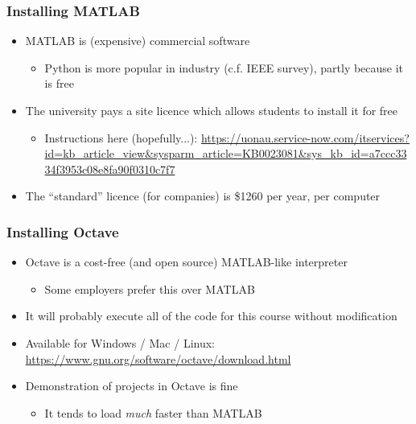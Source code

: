 \documentclass[14pt]{beamer}
\begin{document}
\begin{frame}
\frametitle{Installing MATLAB}
\begin{itemize}
\item MATLAB is (expensive) commercial software
	\begin{itemize}
		\item Python is more popular in industry (c.f. IEEE survey), partly because it is free
	\end{itemize}
\item The university pays a site licence which allows students to install it for free
	\begin{itemize}
		\item Instructions here (hopefully...): \url{https://uonau.service-now.com/itservices?id=kb_article_view&sysparm_article=KB0023081&sys_kb_id=a7ccc3334f3953c08e8fa90f0310c7f7}
	\end{itemize}
\item The ``standard'' licence (for companies) is \$1260 per year, per computer
\end{itemize}
\end{frame}

\begin{frame}
\frametitle{Installing Octave}
\begin{itemize}
\item Octave is a cost-free (and open source) MATLAB-like interpreter
	\begin{itemize}
		\item Some employers prefer this over MATLAB
	\end{itemize}
\item It will probably execute all of the code for this course without modification
\item Available for Windows / Mac / Linux: \url{https://www.gnu.org/software/octave/download.html}
\item Demonstration of projects in Octave is fine
	\begin{itemize}
		\item It tends to load \textit{much} faster than MATLAB
	\end{itemize}
\end{itemize}
\end{frame}
\end{document}
